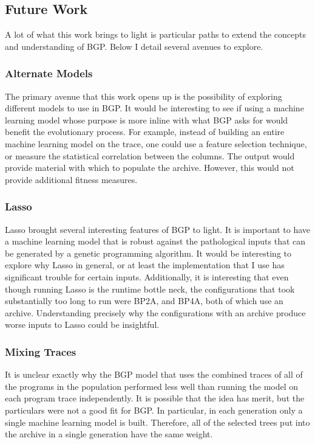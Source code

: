 \subsection{Future Work}\label{section:future_work}
A lot of what this work brings to light is particular paths to extend the concepts and understanding of BGP.  Below I detail several avenues to explore.

\subsubsection{Alternate Models}
The primary avenue that this work opens up is the possibility of exploring different models to use in BGP.  It would be interesting to see if using a machine learning model whose purpose is more inline with what BGP asks for would benefit the evolutionary process.  For example, instead of building an entire machine learning model on the trace, one could use a feature selection technique, or measure the statistical correlation between the columns.  The output would provide material with which to populate the archive.  However, this would not provide additional fitness measures.

\subsubsection{Lasso}
Lasso brought several interesting features of BGP to light.  It is important to have a machine learning model that is robust against the pathological inputs that can be generated by a genetic programming algorithm.  It would be interesting to explore why Lasso in general, or at least the implementation that I use has significant trouble for certain inputs.  Additionally, it is interesting that even though running Lasso is the runtime bottle neck, the configurations that took substantially too long to run were BP2A, and BP4A, both of which use an archive.  Understanding precisely why the configurations with an archive produce worse inputs to Lasso could be insightful.

\subsubsection{Mixing Traces}
It is unclear exactly why the BGP model that uses the combined traces of all of the programs in the population performed less well than running the model on each program trace independently.  It is possible that the idea has merit, but the particulars were not a good fit for BGP.  In particular, in each generation only a single machine learning model is built.  Therefore, all of the selected trees put into the archive in a single generation have the same weight.

